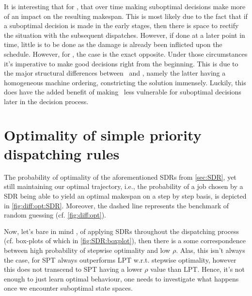 It is interesting that for \JSP, that over time making suboptimal decisions make more of an impact on the resulting makespan. This is most likely due to the fact that if a suboptimal decision is made in the early stages, then there is space to rectify the situation with the subsequent dispatches. However, if done at a later point in time, little is to be done as the damage is already been inflicted upon the schedule. 
However, for \FSP, the case is the exact opposite. Under those circumstances it's imperative to make good decisions right from the beginning. This is due to the major structural differences between \jsp\ and \fsp, namely the latter having a homogeneous machine ordering, constricting the solution immensely. Luckily, this does have the added benefit of making \fsp\ less vulnerable for suboptimal decisions later in the decision process. 


\section{Optimality of simple priority dispatching rules}\label{sec:diff:opt:sdr}
The probability of optimality of the aforementioned SDRs from \cref{sec:SDR}, yet still maintaining our optimal trajectory, i.e., the probability of a job chosen by a SDR being able to yield an optimal makespan on a step by step basis, is depicted  in   \cref{fig:diff:opt:SDR}. Moreover, the dashed line represents the benchmark of random guessing (cf. \cref{fig:diff:opt}).

Now, let's bare in mind \namerho, of applying SDRs throughout the dispatching process (cf. box-plots of which in \cref{fig:SDR:boxplot}), then there is a some correspondence between high probability of stepwise optimality and low $\rho$. Alas, this isn't always the case, for  SPT always outperforms LPT w.r.t. stepwise optimality, however this does not transcend to SPT having a lower $\rho$ value than LPT. Hence, it's not enough to just learn optimal behaviour, one needs to investigate what happens once we encounter suboptimal state spaces.

